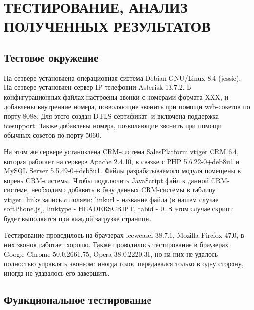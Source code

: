 \chapter{ТЕСТИРОВАНИЕ, АНАЛИЗ ПОЛУЧЕННЫХ РЕЗУЛЬТАТОВ}

\section{Тестовое окружение}

На сервере установлена операционная система Debian GNU/Linux 8.4 (jessie). На сервере установлен сервер IP-телефонии Asterisk 13.7.2. В конфигурационных файлах настроены звонки с номерами формата XXX, и добавлены внутренние номера, позволяющие звонить при помощи web-сокетов по порту 8088. Для этого создан DTLS-сертификат, и включена поддержка icesupport.\cite{asterisk} Также добавлены номера, позволяющие звонить при помощи обычных сокетов по порту 5060.

На этом же сервере установлена CRM-система SalesPlatform vtiger CRM 6.4, которая работает на сервере Apache 2.4.10, в связке с PHP 5.6.22-0+deb8u1 и MySQL Server 5.5.49-0+deb8u1. Файлы разрабатываемого модуля помещены в корень CRM-системы. Чтобы подключить JavaScript файл к данной CRM-системе, необходимо добавить в базу данных CRM-системы в таблицу vtiger\_links запись c полями: linkurl - название файла (в нашем случае softPhone.js), linktype - HEADERSCRIPT, tabid - 0.\cite{vtiger_db} В этом случае скрипт будет выполнятся при каждой загрузке страницы.

Тестирование проводилось на браузерах Iceweasel 38.7.1, Mozilla Firefox 47.0, в них звонок работает хорошо. Также проводилось тестирование в браузерах Google Chrome 50.0.2661.75, Opera 38.0.2220.31, но на них не удалось полностью управлять звонком: иногда голос передавался только в одну сторону, иногда не удавалось его завершить.

\section{Функциональное тестирование}

